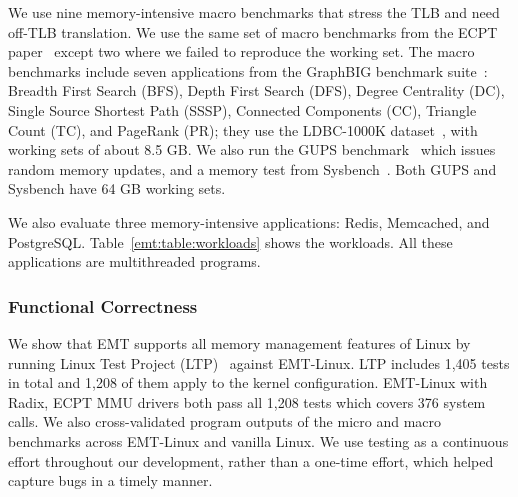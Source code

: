 We use nine memory-intensive macro benchmarks
	that stress the TLB and need off-TLB translation.
We use the same set of macro benchmarks from the ECPT paper~\cite{skarlatos2020ecpt,jovan2022nestedecpt}
	except two where we failed to reproduce the working set.
The macro benchmarks include seven applications from the GraphBIG benchmark suite~\cite{bench:graphbig}: 
	Breadth First Search (BFS), 
	Depth First Search (DFS), 
	Degree Centrality (DC), 
	Single Source Shortest Path (SSSP), 
	Connected Components (CC), 
	Triangle Count (TC), and PageRank (PR); they use the LDBC-1000K dataset~\cite{bench:graphbig-LDBC}, 
	with working sets of about 8.5 GB. 
We also run the GUPS benchmark~\cite{bench:gups} which issues random memory updates,
	and a memory test from Sysbench~\cite{bench:sysbench}. Both GUPS and Sysbench
	have 64 GB working sets.

We also evaluate three memory-intensive applications:
	Redis, Memcached, and PostgreSQL.
Table~\ref{emt:table:workloads} shows the workloads.
All these applications are multithreaded programs.


\subsubsection{Functional Correctness}
\label{emt:ss:correctness}

\noindent
We show that EMT supports all memory management features of Linux
	by running Linux Test Project (LTP)~\cite{tool:ltp} against EMT-Linux.
LTP includes 1,405 tests in total and 1,208 of them apply to the kernel configuration.
EMT-Linux with Radix, ECPT MMU drivers both pass all 1,208 tests
	which covers 376 system calls.
We also cross-validated program outputs of the micro and macro benchmarks
	across EMT-Linux and vanilla Linux.
We use testing as a continuous effort throughout our development,
	rather than a one-time effort, which
	helped capture bugs in a timely manner.

